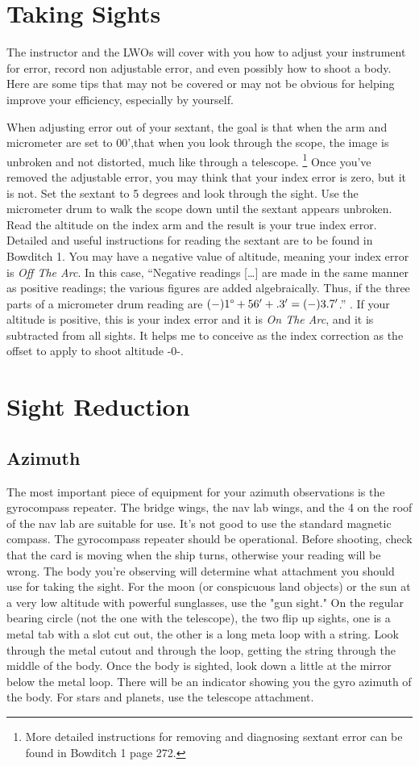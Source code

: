 \documentclass[letterpaper,12pt]{article}
\begin{document}
\section{Taking Sights}
The instructor and the LWOs will cover with you how to adjust your instrument for error, record non adjustable error, and even possibly how to shoot a body.
Here are some tips that may not be covered or may not be obvious for helping improve your efficiency, especially by yourself.

When adjusting error out of your sextant, the goal is that when the arm and micrometer are set to 00',that when you look through the scope, the image is unbroken and not distorted, much like through a telescope. 
\footnote{More detailed instructions for removing and diagnosing sextant error can be found in Bowditch 1 page 272.}
Once you've removed the adjustable error, you may think that your index error is zero, but it is not.
Set the sextant to 5 degrees and look through the sight. Use the micrometer drum to walk the scope down until the sextant appears unbroken.
Read the altitude on the index arm and the result is your true index error.
Detailed and useful instructions for reading the sextant are to be found in Bowditch 1.
You may have a negative value of altitude, meaning your index error is \emph{Off The Arc}.
In this case, ``Negative readings [\ldots] are made in the same manner as positive readings; the various figures are added algebraically. 
Thus, if the three parts of a micrometer drum reading are \((-)1\degree{}+56'+.3'=(-)3.7'\).'' \parencite[p 269]{1bow}.
If your altitude is positive, this is your index error and it is \emph{On The Arc}, and it is subtracted from all sights.
It helps me to conceive as the index correction as the offset to apply to shoot altitude -0-.
\section{Sight Reduction}

\subsection{Azimuth}
The most important piece of equipment for your azimuth observations is the gyrocompass repeater. The bridge wings, the nav lab wings, and the 4 on the roof of the nav lab are suitable for use.
It's not good to use the standard magnetic compass.
The gyrocompass repeater should be operational.
Before shooting, check that the card is moving when the ship turns, otherwise your reading will be wrong.
The body you're observing will determine what attachment you should use for taking the sight.
For the moon (or conspicuous land objects) or the sun at a very low altitude with powerful sunglasses, use the "gun sight."
On the regular bearing circle (not the one with the telescope), the two flip up sights, one is a metal tab with a slot cut out, the other is a long meta loop with a string.
Look through the metal cutout and through the loop, getting the string through the middle of the body.
Once the body is sighted, look down a little at the mirror below the metal loop.
There will be an indicator showing you the gyro azimuth of the body.
For stars and planets, use the telescope attachment.
\end{document}
